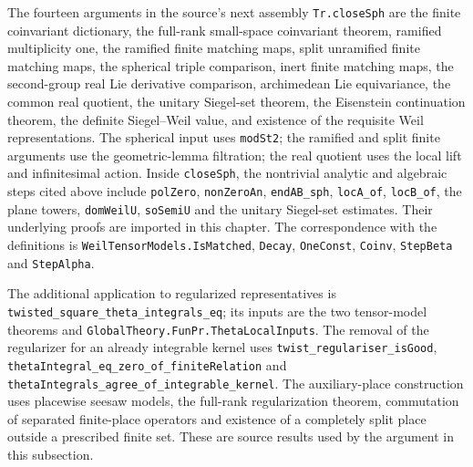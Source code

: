 The fourteen arguments in the source's next assembly
\texttt{Tr.\allowbreak{}close\allowbreak{}Sph} are the finite coinvariant dictionary,
the full-rank small-space coinvariant theorem, ramified
multiplicity one, the ramified finite matching maps, split
unramified finite matching maps, the spherical triple comparison,
inert finite matching maps, the second-group real Lie derivative
comparison, archimedean Lie equivariance, the common real quotient,
the unitary Siegel-set theorem, the Eisenstein continuation theorem,
the definite Siegel--Weil value, and existence of the requisite
Weil representations. The spherical input uses
\texttt{mod\allowbreak{}St2}; the ramified and split finite arguments use the
geometric-lemma filtration; the real quotient uses the local lift
and infinitesimal action. Inside \texttt{close\allowbreak{}Sph}, the
nontrivial analytic and algebraic steps cited above include
\texttt{pol\allowbreak{}Zero}, \texttt{non\allowbreak{}Zero\allowbreak{}An}, \texttt{end\allowbreak{}AB\_\allowbreak{}sph},
\texttt{loc\allowbreak{}A\_\allowbreak{}of}, \texttt{loc\allowbreak{}B\_\allowbreak{}of}, the plane towers,
\texttt{dom\allowbreak{}Weil\allowbreak{}U}, \texttt{so\allowbreak{}Semi\allowbreak{}U} and the unitary Siegel-set
estimates. Their underlying proofs are imported in this chapter.
The correspondence with the definitions is
\texttt{Weil\allowbreak{}Tensor\allowbreak{}Models.\allowbreak{}Is\allowbreak{}Matched}, \texttt{Decay},
\texttt{One\allowbreak{}Const}, \texttt{Coinv}, \texttt{Step\allowbreak{}Beta} and
\texttt{Step\allowbreak{}Alpha}.

The additional application to regularized representatives is
\texttt{twisted\_\allowbreak{}square\_\allowbreak{}theta\_\allowbreak{}integrals\_\allowbreak{}eq}; its inputs are
the two tensor-model theorems and
\texttt{Global\allowbreak{}Theory.\allowbreak{}Fun\allowbreak{}Pr.\allowbreak{}Theta\allowbreak{}Local\allowbreak{}Inputs}. The removal of the
regularizer for an already integrable kernel uses
\texttt{twist\_\allowbreak{}regulariser\_\allowbreak{}is\allowbreak{}Good},
\texttt{theta\allowbreak{}Integral\_\allowbreak{}eq\_\allowbreak{}zero\_\allowbreak{}of\_\allowbreak{}finite\allowbreak{}Relation} and
\texttt{theta\allowbreak{}Integrals\_\allowbreak{}agree\_\allowbreak{}of\_\allowbreak{}integrable\_\allowbreak{}kernel}.
The auxiliary-place construction uses placewise seesaw models,
the full-rank regularization theorem, commutation of separated
finite-place operators and existence of a completely split place
outside a prescribed finite set. These are source results used by
the argument in this subsection.
